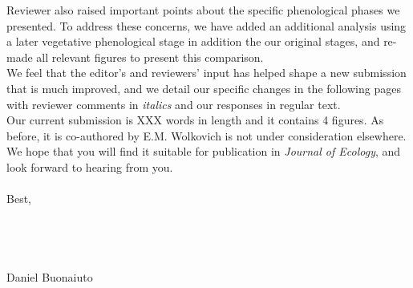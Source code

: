 \documentclass[11.75 pt]{article}\usepackage[]{graphicx}\usepackage[]{color}
\begin{document}
\noindent Reviewer also raised important points about the specific phenological phases we presented. To address these concerns, we have added an additional analysis using a later vegetative phenological stage in addition the our original stages, and re-made all relevant figures to present this comparison.\\

\noindent We feel that the editor's and reviewers' input has helped shape a new submission that is much improved, and we detail our specific changes in the following pages with reviewer comments in \emph{italics} and our responses in regular text.\\

\noindent Our current submission is XXX words in length and it contains 4 figures. As before, it is co-authored by E.M. Wolkovich is not under consideration elsewhere. We hope that you will find it suitable for publication in \textit{Journal of Ecology}, and look forward to hearing from you.\\\\ 


\noindent Best,\\
\\\\\\\\



\noindent Daniel Buonaiuto
\end{document}
